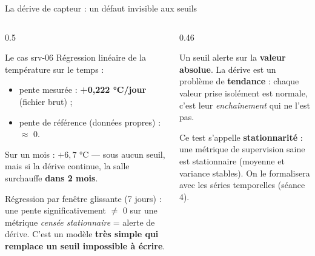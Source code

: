 \begin{frame}{La dérive de capteur : un défaut invisible aux seuils}
\begin{columns}[t]
\begin{column}{0.5\textwidth}
\begin{block}{Le cas srv-06}
Régression linéaire de la température sur le temps :
\begin{itemize}
\item pente mesurée : \textbf{+0,222 °C/jour} (fichier brut) ;
\item pente de référence (données propres) : $\approx$ 0.
\end{itemize}
Sur un mois : $+6{,}7$ °C --- sous aucun seuil, mais si la dérive
continue, la salle surchauffe \textbf{dans 2 mois}.
\end{block}
\begin{ebox}
Régression par fenêtre glissante (7 jours) : une pente
significativement $\ne$ 0 sur une métrique \emph{censée stationnaire}
= alerte de dérive. C'est un modèle \textbf{très simple qui remplace
un seuil impossible à écrire}.
\end{ebox}
\end{column}
\begin{column}{0.46\textwidth}
\begin{wbox}
Un seuil alerte sur la \textbf{valeur absolue}. La dérive est un
problème de \textbf{tendance} : chaque valeur prise isolément est
normale, c'est leur \emph{enchaînement} qui ne l'est pas.
\end{wbox}
\begin{kbox}[Vocabulaire]
Ce test s'appelle \textbf{stationnarité} : une métrique de supervision
saine est stationnaire (moyenne et variance stables). On le formalisera
avec les séries temporelles (séance 4).
\end{kbox}
\end{column}
\end{columns}
\end{frame}

